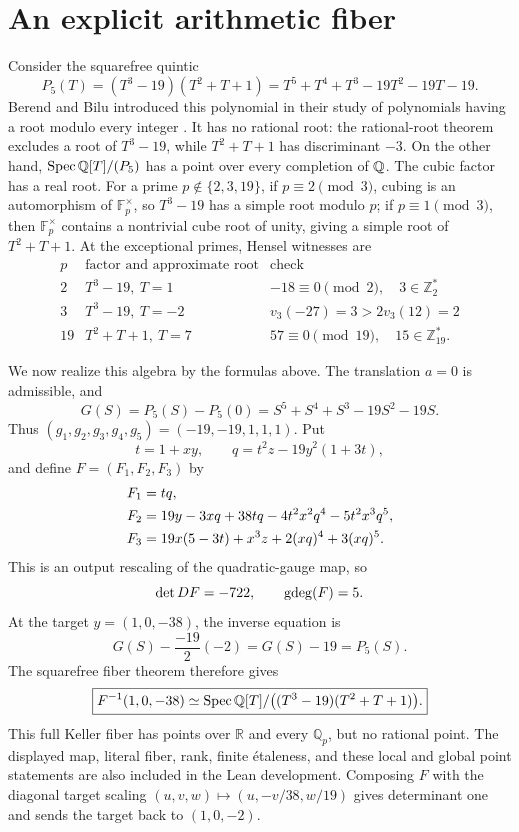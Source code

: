 \section{An explicit arithmetic fiber}\label{sec:example}

Consider the squarefree quintic
\[
 P_5(T)=(T^3-19)(T^2+T+1)
 =T^5+T^4+T^3-19T^2-19T-19.
\]
Berend and Bilu introduced this polynomial in their study of polynomials
having a root modulo every integer \cite{BerendBilu}.
It has no rational root: the rational-root theorem excludes a root of
\(T^3-19\), while \(T^2+T+1\) has discriminant \(-3\).  On the other hand,
\(\operatorname{Spec}\mathbb Q[T]/(P_5)\) has a point over every completion of \(\mathbb Q\).  The cubic
factor has a real root.  For a prime
\(p\notin\{2,3,19\}\), if \(p\equiv2\pmod3\), cubing is an automorphism of
\(\mathbb F_p^\times\), so \(T^3-19\) has a simple root modulo \(p\); if
\(p\equiv1\pmod3\), then \(\mathbb F_p^\times\) contains a nontrivial cube
root of unity, giving a simple root of \(T^2+T+1\).  At the exceptional
primes, Hensel witnesses are
\[
\begin{array}{c|c|c}
p&\text{factor and approximate root}&\text{check}\\ \hline
2&T^3-19,\ T=1&-18\equiv0\pmod2,\quad 3\in\mathbb Z_2^*\\
3&T^3-19,\ T=-2&v_3(-27)=3>2v_3(12)=2\\
19&T^2+T+1,\ T=7&57\equiv0\pmod{19},\quad15\in\mathbb Z_{19}^*.
\end{array}
\]

We now realize this algebra by the formulas above.  The translation \(a=0\)
is admissible, and
\[
 G(S)=P_5(S)-P_5(0)
 =S^5+S^4+S^3-19S^2-19S.
\]
Thus \((g_1,g_2,g_3,g_4,g_5)=(-19,-19,1,1,1)\).  Put
\[
 t=1+xy,\qquad q=t^2z-19y^2(1+3t),
\]
and define \(F=(F_1,F_2,F_3)\) by
\begin{align}
 F_1={}&tq,\notag\\
 F_2={}&19y-3xq+38tq-4t^2x^2q^4-5t^2x^3q^5,\notag\\
 F_3={}&19x(5-3t)+x^3z+2(xq)^4+3(xq)^5.
 \label{eq:explicit-quintic-map}
\end{align}
This is an output rescaling of the quadratic-gauge map, so
\[
 \det DF=-722,\qquad \operatorname{gdeg}(F)=5.
\]
At the target \(y=(1,0,-38)\), the inverse equation is
\[
 G(S)-\frac{-19}{2}(-2)=G(S)-19=P_5(S).
\]
The squarefree fiber theorem therefore gives
\[
 \boxed{F^{-1}(1,0,-38)
 \simeq\operatorname{Spec}\mathbb Q[T]/\bigl((T^3-19)(T^2+T+1)\bigr).}
\]
This full Keller fiber has points over \(\mathbb R\) and every
\(\mathbb Q_p\), but no rational point.  The displayed map, literal fiber,
rank, finite \'etaleness, and these local and global point statements are
also included in the Lean development.  Composing \(F\) with the diagonal
target scaling
\((u,v,w)\mapsto(u,-v/38,w/19)\) gives determinant one and sends the target
back to \((1,0,-2)\).
